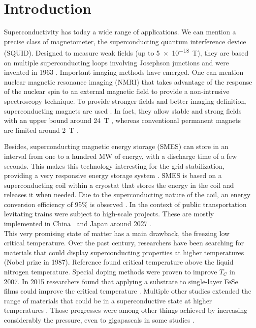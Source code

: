 \documentclass[../main.tex]{subfile}
\begin{document}
\section{Introduction}

Superconductivity has today a wide range of applications. We can mention a precise class of magnetometer, the superconducting quantum interference device (SQUID).
Designed to measure weak fields (up to \SI{5e-18}{\tesla})\cite{Range2004}, they are based on multiple superconducting loops involving Josephson junctions and were invented
in 1963 \cite{JAKLEVIC1964}.
Important imaging methods have emerged. One can mention nuclear magnetic resonance imaging (NMRI) that takes advantage of the response of the nuclear spin to an external 
magnetic field to provide a non-intrusive spectroscopy technique. To provide stronger fields and better imaging definition, superconducting magnets are used \cite{Nakamura2015}. In fact, they
allow stable and strong fields with an upper bound around \SI{24}{\tesla} \cite{Hashi2015}, whereas conventional permanent magnets are limited around \SI{2}{\tesla} \cite{Haishi2005}.

Besides, superconducting magnetic energy storage (SMES) can store in an interval from one to a hundred MW of energy, with a discharge time of a few seconds. This makes
this technology interesting for the grid stabilization, providing a very responsive energy storage system \cite{Tixador2008}.
SMES is based on a superconducting coil within a cryostat that stores the energy in the coil and releases it when needed. Due to the superconducting nature of the coil,
an energy conversion efficiency of 95\% is observed \cite{Tixador2008}.
In the context of public transportation levitating trains were subject to high-scale projects. These are mostly implemented in China~\cite{Roque2024} and Japan around 2027 \cite{Nishijima2013}.\\

This very promising state of matter has a main drawback, the freezing low critical temperature. Over the past century, researchers 
have been searching for materials that could display superconducting properties at higher temperatures \cite{Bednorz1986} (Nobel prize in 1987).
Reference \cite{PhysRevLett.58.908} found critical temperature above the liquid nitrogen temperature.
Special doping methods were proven to improve $T_C$ \cite{Doiron-Leyraud2007} in 2007.
In 2015 researchers found that applying a substrate to single-layer FeSe films could improve the critical temperature \cite{Ge2015}.
Multiple other studies extended the range of materials that could be in a superconductive state at higher temperatures \cite{Einaga2016}\cite{Drozdov_2019} \cite{lee2023}.
Those progresses were among other things achieved by increasing considerably the pressure, even to gigapascals in some studies \cite{Drozdov_2019}.\\
\end{document}
